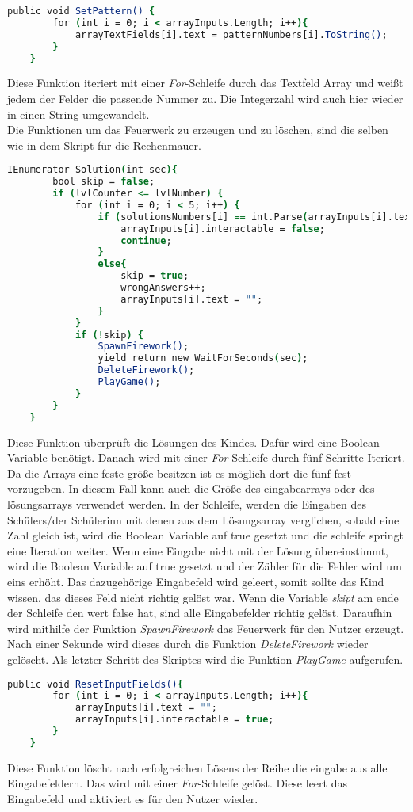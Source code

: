 \begin{lstlisting}[language=csh, caption={hideCircle.cs SetPattern-Funktion}]
	public void SetPattern() {
		for (int i = 0; i < arrayInputs.Length; i++){
			arrayTextFields[i].text = patternNumbers[i].ToString();
		}
	}
\end{lstlisting}
Diese Funktion iteriert mit einer \textit{For}-Schleife durch das Textfeld Array und weißt jedem der Felder die passende Nummer zu. Die Integerzahl wird auch hier wieder in einen String umgewandelt.\\
Die Funktionen um das Feuerwerk zu erzeugen und zu löschen, sind die selben wie in dem Skript für die Rechenmauer.\\ %
\begin{lstlisting}[language=csh, caption={hideCircle.cs Solution-Funktion}]
	IEnumerator Solution(int sec){
		bool skip = false;
		if (lvlCounter <= lvlNumber) {
			for (int i = 0; i < 5; i++) {
				if (solutionsNumbers[i] == int.Parse(arrayInputs[i].text)) {
					arrayInputs[i].interactable = false;
					continue;
				}
				else{
					skip = true;
					wrongAnswers++;
					arrayInputs[i].text = "";
				}
			}
			if (!skip) {
				SpawnFirework();
				yield return new WaitForSeconds(sec);
				DeleteFirework();
				PlayGame();
			}
		}
	}
\end{lstlisting}
Diese Funktion überprüft die Lösungen des Kindes. Dafür wird eine Boolean Variable benötigt. Danach wird mit einer \textit{For}-Schleife durch fünf Schritte Iteriert. Da die Arrays eine feste größe besitzen ist es möglich dort die fünf fest vorzugeben. In diesem Fall kann auch die Größe des eingabearrays oder des lösungsarrays verwendet werden. In der Schleife, werden die Eingaben des Schülers/der Schülerinn mit denen aus dem Lösungsarray verglichen, sobald eine Zahl gleich ist, wird die Boolean Variable auf true gesetzt und die schleife springt eine Iteration weiter. Wenn eine Eingabe nicht mit der Lösung übereinstimmt, wird die Boolean Variable auf true gesetzt und der Zähler für die Fehler wird um eins erhöht. Das dazugehörige Eingabefeld wird geleert, somit sollte das Kind wissen, das dieses Feld nicht richtig gelöst war. Wenn die Variable \textit{skipt} am ende der Schleife den wert false hat, sind alle Eingabefelder richtig gelöst. Daraufhin wird mithilfe der Funktion \textit{SpawnFirework} das Feuerwerk für den Nutzer erzeugt. Nach einer Sekunde wird dieses durch die Funktion \textit{DeleteFirework} wieder gelöscht. Als letzter Schritt des Skriptes wird die Funktion \textit{PlayGame} aufgerufen. \\
\begin{lstlisting}[language=csh, caption={hideCircle.cs ResetInputFields-Funktion}]
	public void ResetInputFields(){
		for (int i = 0; i < arrayInputs.Length; i++){
			arrayInputs[i].text = "";
			arrayInputs[i].interactable = true;
		}
	}
\end{lstlisting}
Diese Funktion löscht nach erfolgreichen Lösens der Reihe die eingabe aus alle Eingabefeldern. Das wird mit einer \textit{For}-Schleife gelöst. Diese leert das Eingabefeld und aktiviert es für den Nutzer wieder.
